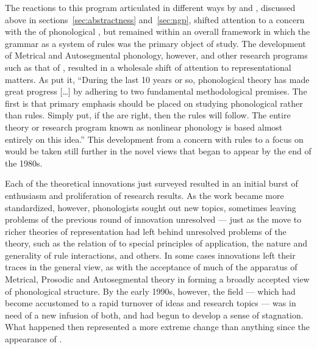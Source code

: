 \largerpage
The reactions to this program articulated in different ways by
\citet{kiparsky:3dimensions} and \citet{hooper:ngp}, discussed above
in sections~\ref{sec:abstractness} and~\ref{sec:ngp}, shifted
attention to a concern with the  of phonological
, but remained within an overall framework in which the
grammar as a system of rules was the primary object of study. The
development of Metrical and Autosegmental phonology, however, and
other research programs such as that of , resulted in
a wholesale shift of attention to representational matters. As
\citet[84]{mccarthy:feature-geometry} put it, ``During the last 10
years or so, phonological theory has made great progress {[\ldots]} by
adhering to two fundamental methodological premises. The first is that
primary emphasis should be placed on studying phonological
 rather than rules. Simply put, if the 
are right, then the rules will follow. The entire theory or research
program known as nonlinear phonology is based almost entirely on this
idea.'' This development from a concern with rules to a focus on
 would be taken still further in the novel views that
began to appear by the end of the 1980s.

Each of the theoretical innovations just surveyed resulted in an
initial burst of enthusiasm and proliferation of research results. As
the work became more standardized, however, phonologists sought out
new topics, sometimes leaving problems of the previous round of
innovation unresolved --- just as the move to richer theories of
representation had left behind unresolved problems of the \textsl{}
theory, such as the relation of  to special
principles of application, the nature and generality of rule interactions,
and others. In some cases innovations left their traces in the general
view, as with the acceptance of much of the apparatus of Metrical,
Prosodic and Autosegmental theory in forming a broadly accepted view
of phonological structure. By the early 1990s, however, the field ---
which had become accustomed to a rapid turnover of ideas and research
topics --- was in need of a new infusion of both, and had begun to
develop a sense of stagnation. What happened then represented a more
extreme change than anything since the appearance of \textsl{}.

